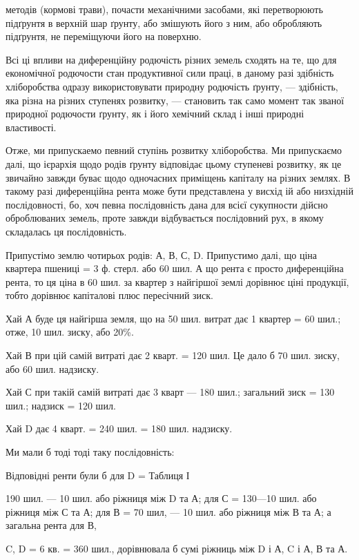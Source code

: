 \parcont{}  %
методів (кормові трави), почасти механічними засобами, які перетворюють
підґрунтя в верхній шар ґрунту, або змішують його з ним, або обробляють підґрунтя,
не переміщуючи його на поверхню.

Всі ці впливи на диференційну родючість різних земель сходять на те, що для
економічної родючости стан продуктивної сили праці, в даному разі здібність хліборобства
одразу використовувати природну родючість ґрунту, — здібність, яка різна
на різних ступенях розвитку, — становить так само момент так званої природної
родючости ґрунту, як і його хемічний склад і інші природні властивості.

Отже, ми припускаемо певний ступінь розвитку хліборобства. Ми припускаємо
далі, що ієрархія щодо родів ґрунту відповідає цьому ступеневі розвитку,
як це звичайно завжди буває щодо одночасних приміщень капіталу на різних
землях. В такому разі диференційна рента може бути представлена у висхід ій
або низхідній послідовності, бо, хоч певна послідовність дана для всієї сукупности
дійсно оброблюваних земель, проте завжди відбувається послідовний рух,
в якому складалась ця послідовність.

Припустімо землю чотирьох родів: А, В, С, D. Припустимо далі, що ціна
квартера пшениці = 3 ф. стерл. або 60 шил. А що рента є просто диференційна рента,
то ця ціна в 60 шил. за квартер з найгіршої землі дорівнює ціні продукції,
тобто дорівнює капіталові плюс пересічний зиск.

Хай А буде ця найгірша земля, що на 50 шил. витрат дає 1 квартер = 60
шил.; отже, 10 шил. зиску, або 20\%.

Хай В при цій самій витраті дає 2 кварт. = 120 шил. Це дало б 70 шил.
зиску, або 60 шил. надзиску.

Хай С при такій самій витраті дає 3 кварт — 180 шил.; загальний
зиск = 130 шил.; надзиск = 120 шил.

Хай D дає 4 кварт. = 240 шил. = 180 шил. надзиску.

Ми мали б тоді тоді таку послідовність:

Відповідні ренти
були б для D = Таблиця І

190 шил. — 10 шил.
або ріжниця між D та
А; для С = 130—10
шил. або ріжниця
між С та А; для
В = 70 шил, — 10
шил. або ріжниця
між В та А; а загальна
рента для В,

C, D = 6 кв. = 360
шил., дорівнювала б
сумі ріжниць між
D і А, C і А, В та А.

